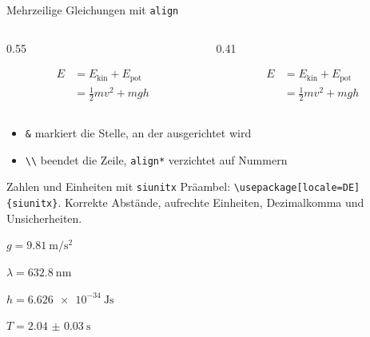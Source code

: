 \begin{frame}[fragile]{Mehrzeilige Gleichungen mit \texttt{align}}
  \begin{columns}[c]
    \begin{column}{0.55\textwidth}
\begin{code}
\begin{align}
  E &= E_\text{kin} + E_\text{pot} \\
    &= \frac{1}{2} m v^2 + m g h
\end{align}
\end{code}
    \end{column}
    \begin{column}{0.41\textwidth}
      \begin{bildkarte}
        \vspace{-0.6em}
        \begin{align}
          E &= E_\text{kin} + E_\text{pot} \\
            &= \frac{1}{2} m v^2 + m g h
        \end{align}
      \end{bildkarte}
    \end{column}
  \end{columns}
  \vspace{0.8em}
  \begin{itemize}
    \item \texttt{\&} markiert die Stelle, an der ausgerichtet wird
    \item \texttt{\textbackslash\textbackslash} beendet die Zeile, \texttt{align*} verzichtet auf Nummern
  \end{itemize}
\end{frame}

\begin{frame}[fragile]{Zahlen und Einheiten mit \texttt{siunitx}}
  \small Präambel: \texttt{\textbackslash usepackage[locale=DE]\{siunitx\}}. Korrekte Abstände, aufrechte Einheiten, Dezimalkomma und Unsicherheiten.\par\vspace{0.4em}
\begin{codeerg}
$g = \qty{9.81}{\metre\per\second\squared}$

$\lambda = \qty{632.8}{\nano\metre}$

$h = \qty{6.626e-34}{\joule\second}$

$T = \qty{2.04(3)}{\second}$
\end{codeerg}
\end{frame}
